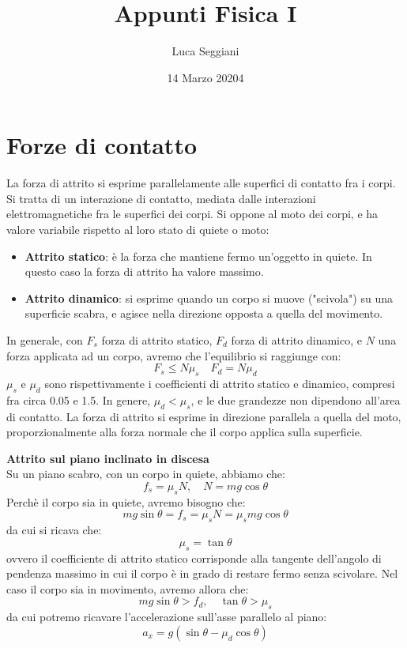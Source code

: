 \documentclass[a4paper,12pt]{article}
\title{Appunti Fisica I}
\author{Luca Seggiani}
\date{14 Marzo 20204}
\begin{document}
\maketitle
\section{Forze di contatto}
La forza di attrito si esprime parallelamente alle superfici di contatto fra i corpi. Si tratta di un interazione
di contatto, mediata dalle interazioni elettromagnetiche fra le superfici dei corpi. Si oppone al moto dei corpi, e ha valore
variabile rispetto al loro stato di quiete o moto:
\begin{itemize}
  \item \textbf{Attrito statico}: è la forza che mantiene fermo un'oggetto in quiete. In questo caso la forza di attrito
    ha valore massimo.
  \item \textbf{Attrito dinamico}: si esprime quando un corpo si muove ("scivola") su una superficie scabra, 
    e agisce nella direzione opposta a quella del movimento.
\end{itemize}
In generale, con $F_s$ forza di attrito  statico, $F_d$ forza di attrito dinamico, e $N$ una forza applicata ad un corpo,
avremo che l'equilibrio si raggiunge con:
$$ F_s \leq N\mu_s \quad F_d = N\mu_d $$
$\mu_s$ e $\mu_d$ sono rispettivamente i coefficienti di attrito statico e dinamico, compresi fra circa 0.05 e 1.5.
In genere, $\mu_d < \mu_s$, e le due grandezze non dipendono all'area di contatto. La forza di attrito si esprime in direzione
parallela a quella del moto, proporzionalmente alla forza normale che il corpo applica sulla superficie.
\par\smallskip
\textbf{Attrito sul piano inclinato in discesa} \\
Su un piano scabro, con un corpo in quiete, abbiamo che:
$$ f_{s} = \mu_sN, \quad N = mg\cos{\theta} $$
Perchè il corpo sia in quiete, avremo bisogno che:
$$ mg\sin{\theta} = f_{s} = \mu_sN = \mu_smg\cos{\theta}$$
da cui si ricava che:
$$ \mu_s = \tan{\theta} $$
ovvero il coefficiente di attrito statico corrisponde alla tangente dell'angolo di pendenza massimo in cui il corpo
è in grado di restare fermo senza scivolare.
Nel caso il corpo sia in movimento, avremo allora che:
$$ mg\sin{\theta} > f_d, \quad \tan{\theta} > \mu_s $$
da cui potremo ricavare l'accelerazione sull'asse parallelo al piano:
$$ a_x = g(\sin{\theta - \mu_d\cos{\theta}}) $$
\end{document}
